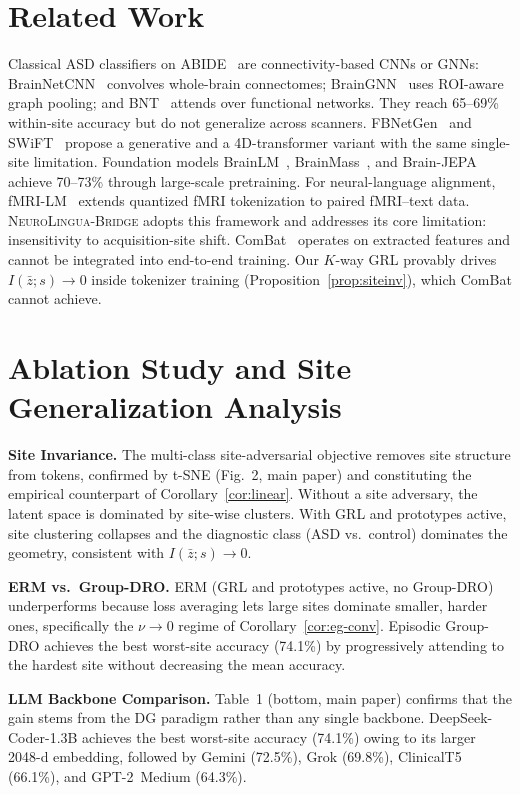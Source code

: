 \documentclass[runningheads]{llncs}
\newcommand{\method}{\textsc{NeuroLingua-Bridge}}
\begin{document}
\section{Related Work}
\label{app:related}
Classical ASD classifiers on ABIDE~\cite{dimartino2014abide} are connectivity-based CNNs or GNNs: BrainNetCNN~\cite{kawahara2017brainnetcnn} convolves whole-brain connectomes; BrainGNN~\cite{li2021braingnn} uses ROI-aware graph pooling; and BNT~\cite{kan2022bnt} attends over functional networks. They reach 65--69\% within-site accuracy but do not generalize across scanners. FBNetGen~\cite{kan2022fbnetgen} and SWiFT~\cite{kim2023swift} propose a generative and a 4D-transformer variant with the same single-site limitation. Foundation models BrainLM~\cite{caro2024brainlm}, BrainMass~\cite{yang2024brainmass}, and Brain-JEPA~\cite{dong2024brainjepa} achieve 70--73\% through large-scale pretraining. For neural-language alignment, fMRI-LM~\cite{wei2026fmrilm} extends quantized fMRI tokenization to paired fMRI--text data. \method{} adopts this framework and addresses its core limitation: insensitivity to acquisition-site shift. ComBat~\cite{fortin2018combat} operates on extracted features and cannot be integrated into end-to-end training. Our $K$-way GRL provably drives $I(\bar z;s)\to 0$ inside tokenizer training (Proposition~\ref{prop:siteinv}), which ComBat cannot achieve.
%
\section{Ablation Study and Site Generalization Analysis}
\label{app:ablation}
\noindent\textbf{Site Invariance.} The multi-class site-adversarial objective removes site structure from tokens, confirmed by t-SNE (Fig.~2, main paper) and constituting the empirical counterpart of Corollary~\ref{cor:linear}. Without a site adversary, the latent space is dominated by site-wise clusters. With GRL and prototypes active, site clustering collapses and the diagnostic class (ASD vs.\ control) dominates the geometry, consistent with $I(\bar z;s)\!\to\!0$.

\noindent\textbf{ERM vs.\ Group-DRO.} ERM (GRL and prototypes active, no Group-DRO) underperforms because loss averaging lets large sites dominate smaller, harder ones, specifically the $\nu\!\to\!0$ regime of Corollary~\ref{cor:eg-conv}. Episodic Group-DRO achieves the best worst-site accuracy (74.1\%) by progressively attending to the hardest site without decreasing the mean accuracy.

\noindent\textbf{LLM Backbone Comparison.} Table~1 (bottom, main paper) confirms that the gain stems from the DG paradigm rather than any single backbone. DeepSeek-Coder-1.3B achieves the best worst-site accuracy (74.1\%) owing to its larger 2048-d embedding, followed by Gemini (72.5\%), Grok (69.8\%), ClinicalT5 (66.1\%), and GPT-2~Medium (64.3\%).
\end{document}
